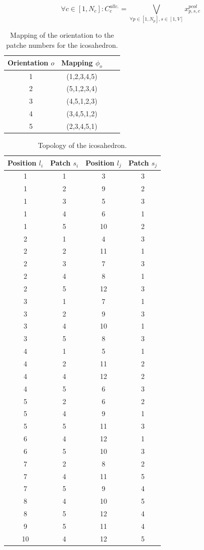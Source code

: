 \documentclass[a4paper, amsfonts, amssymb, amsmath, reprint, showkeys, nofootinbib, twoside]{revtex4-1}
\begin{document}
\begin{equation}
\forall c\in [1, N_c]:C_c^{all c.}= \underset{\forall p \in [1,N_p], s\in [1,V]}{\bigvee} x_{p,s,c}^{pcol}
\end{equation}

\begin{table}[h!]
	\begin{center}
		\begin{tabular}{ cccc } 
			\hline
			Orientation $o$ & Mapping $\phi_o$ \\
			\hline
			1 & (1,2,3,4,5) \\ 
			2 & (5,1,2,3,4) \\ 
			3 & (4,5,1,2,3) \\ 
			4 & (3,4,5,1,2) \\
			5 & (2,3,4,5,1) \\
			\hline
		\end{tabular}
		\caption{Mapping of the orientation to the patche numbers for the icosahedron.}
	\end{center}
\end{table}

\begin{table}[h!]
	\begin{tabular}{ cccc } 
		\hline
		Position $l_i$ & Patch $s_i$ & Position $l_j$ & Patch $s_j$ \\
		\hline
		1 & 1 & 3 & 3 \\
		1 & 2 & 9 & 2 \\
		1 & 3 & 5 & 3 \\
		1 & 4 & 6 & 1 \\
		1 & 5 & 10 & 2 \\
		2 & 1 & 4 & 3 \\
		2 & 2 & 11 & 1 \\
		2 & 3 & 7 & 3 \\
		2 & 4 & 8 & 1 \\
		2 & 5 & 12 & 3 \\
		3 & 1 & 7 & 1 \\
		3 & 2 & 9 & 3 \\
		3 & 4 & 10 & 1 \\
		3 & 5 & 8 & 3 \\
		4 & 1 & 5 & 1 \\
		4 & 2 & 11 & 2 \\
		4 & 4 & 12 & 2 \\
		4 & 5 & 6 & 3 \\
		5 & 2 & 6 & 2 \\
		5 & 4 & 9 & 1 \\
		5 & 5 & 11 & 3 \\
		6 & 4 & 12 & 1 \\
		6 & 5 & 10 & 3 \\
		7 & 2 & 8 & 2 \\
		7 & 4 & 11 & 5 \\
		7 & 5 & 9 & 4 \\
		8 & 4 & 10 & 5 \\
		8 & 5 & 12 & 4 \\
		9 & 5 & 11 & 4 \\
		10 & 4 & 12 & 5 \\
		\hline
	\end{tabular}
	\caption{Topology of the icosahedron.}
\end{table}
\end{document}
